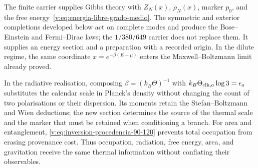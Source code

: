 The finite carrier supplies Gibbs theory with $Z_N(x)$, $\rho_N(x)$, marker
$p_0$, and the free energy~\eqref{v:eq:energia-libre-grado-medio}. The
symmetric and exterior completions developed below act on complete modes and
produce the Bose--Einstein and Fermi--Dirac laws; the $1/380/649$ carrier does
not replace them. It supplies an energy section and a preparation with a
recorded origin. In the dilute regime, the same coordinate
$x=e^{-\beta(E-\mu)}$ enters the Maxwell--Boltzmann limit already proved.

In the radiative realisation, composing $\beta=(k_B\Theta)^{-1}$ with
$k_B\Theta_{{\rm clk},a}\log3=\epsilon_a$ substitutes the calendar scale
in Planck's density without changing the count of two polarisations or their
dispersion. Its moments retain the Stefan--Boltzmann and Wien deductions; the
new section determines the source of the thermal scale and the marker that
must be retained when conditioning a branch. For area and entanglement,
\eqref{v:eq:inversion-procedencia-90-120} prevents total occupation from
erasing provenance cost. Thus occupation, radiation, free energy, area, and
gravitation receive the same thermal information without conflating their
observables.
